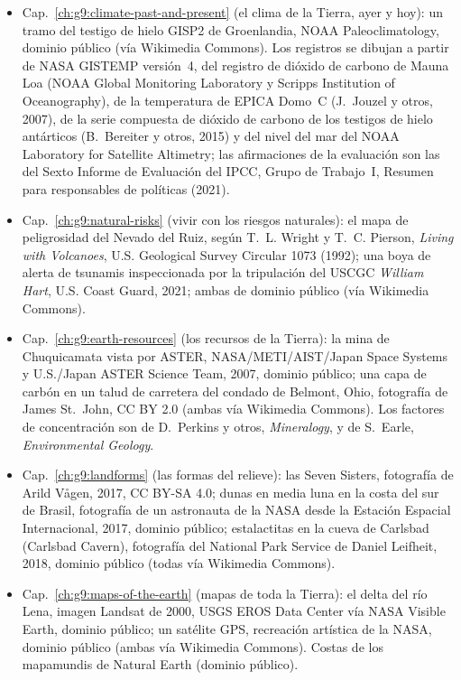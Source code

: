 \begin{itemize}
  \item Cap.~\ref{ch:g9:climate-past-and-present} (el clima de la Tierra, ayer y hoy): un tramo del testigo de hielo GISP2 de Groenlandia, NOAA Paleoclimatology, dominio público (vía Wikimedia Commons). Los registros se dibujan a partir de NASA GISTEMP versión~4, del registro de dióxido de carbono de Mauna Loa (NOAA Global Monitoring Laboratory y Scripps Institution of Oceanography), de la temperatura de EPICA Domo~C (J.~Jouzel y otros, 2007), de la serie compuesta de dióxido de carbono de los testigos de hielo antárticos (B.~Bereiter y otros, 2015) y del nivel del mar del NOAA Laboratory for Satellite Altimetry; las afirmaciones de la evaluación son las del Sexto Informe de Evaluación del IPCC, Grupo de Trabajo~I, Resumen para responsables de políticas (2021).
  \item Cap.~\ref{ch:g9:natural-risks} (vivir con los riesgos naturales): el mapa de peligrosidad del Nevado del Ruiz, según T.~L. Wright y T.~C. Pierson, \emph{Living with Volcanoes}, U.S. Geological Survey Circular 1073 (1992); una boya de alerta de tsunamis inspeccionada por la tripulación del USCGC \emph{William Hart}, U.S. Coast Guard, 2021; ambas de dominio público (vía Wikimedia Commons).
  \item Cap.~\ref{ch:g9:earth-resources} (los recursos de la Tierra): la mina de Chuquicamata vista por ASTER, NASA/\allowbreak METI/\allowbreak AIST/\allowbreak Japan Space Systems y U.S./Japan ASTER Science Team, 2007, dominio público; una capa de carbón en un talud de carretera del condado de Belmont, Ohio, fotografía de James St.~John, CC BY 2.0 (ambas vía Wikimedia Commons). Los factores de concentración son de D.~Perkins y otros, \emph{Mineralogy}, y de S.~Earle, \emph{Environmental Geology}.
  \item Cap.~\ref{ch:g9:landforms} (las formas del relieve): las Seven Sisters, fotografía de Arild Vågen, 2017, CC BY-SA 4.0; dunas en media luna en la costa del sur de Brasil, fotografía de un astronauta de la NASA desde la Estación Espacial Internacional, 2017, dominio público; estalactitas en la cueva de Carlsbad (Carlsbad Cavern), fotografía del National Park Service de Daniel Leifheit, 2018, dominio público (todas vía Wikimedia Commons).
  \item Cap.~\ref{ch:g9:maps-of-the-earth} (mapas de toda la Tierra): el delta del río Lena, imagen Landsat de 2000, USGS EROS Data Center vía NASA Visible Earth, dominio público; un satélite GPS, recreación artística de la NASA, dominio público (ambas vía Wikimedia Commons). Costas de los mapamundis de Natural Earth (dominio público).
\end{itemize}
